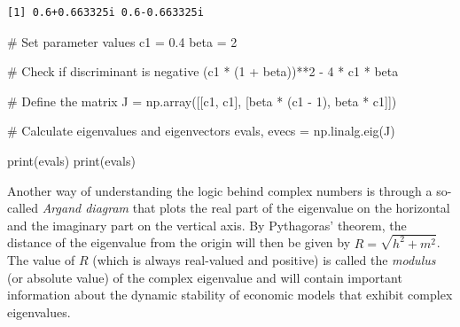 \documentclass[
  letterpaper,
  DIV=11,
  numbers=noendperiod]{scrreprt}
\newenvironment{Shaded}{\begin{snugshade}}{\end{snugshade}}
\newcommand{\BuiltInTok}[1]{\textcolor[rgb]{0.00,0.23,0.31}{#1}}
\newcommand{\CommentTok}[1]{\textcolor[rgb]{0.37,0.37,0.37}{#1}}
\newcommand{\DecValTok}[1]{\textcolor[rgb]{0.68,0.00,0.00}{#1}}
\newcommand{\FloatTok}[1]{\textcolor[rgb]{0.68,0.00,0.00}{#1}}
\newcommand{\NormalTok}[1]{\textcolor[rgb]{0.00,0.23,0.31}{#1}}
\newcommand{\OperatorTok}[1]{\textcolor[rgb]{0.37,0.37,0.37}{#1}}
\begin{document}
\begin{verbatim}
[1] 0.6+0.663325i 0.6-0.663325i
\end{verbatim}

\begin{tcolorbox}[enhanced jigsaw, titlerule=0mm, breakable, bottomrule=.15mm, toprule=.15mm, colbacktitle=quarto-callout-note-color!10!white, rightrule=.15mm, toptitle=1mm, opacityback=0, left=2mm, coltitle=black, title=\textcolor{quarto-callout-note-color}{\faInfo}\hspace{0.5em}{Python code}, colframe=quarto-callout-note-color-frame, opacitybacktitle=0.6, leftrule=.75mm, bottomtitle=1mm, arc=.35mm, colback=white]

\begin{Shaded}
\begin{Highlighting}[]
\CommentTok{\# Set parameter values}
\NormalTok{c1 }\OperatorTok{=} \FloatTok{0.4}
\NormalTok{beta }\OperatorTok{=} \DecValTok{2}

\CommentTok{\# Check if discriminant is negative}
\NormalTok{(c1 }\OperatorTok{*}\NormalTok{ (}\DecValTok{1} \OperatorTok{+}\NormalTok{ beta))}\OperatorTok{**}\DecValTok{2} \OperatorTok{{-}} \DecValTok{4} \OperatorTok{*}\NormalTok{ c1 }\OperatorTok{*}\NormalTok{ beta}

\CommentTok{\# Define the matrix}
\NormalTok{J }\OperatorTok{=}\NormalTok{ np.array([[c1, c1],}
\NormalTok{              [beta }\OperatorTok{*}\NormalTok{ (c1 }\OperatorTok{{-}} \DecValTok{1}\NormalTok{), beta }\OperatorTok{*}\NormalTok{ c1]])}

\CommentTok{\# Calculate eigenvalues and eigenvectors}
\NormalTok{evals, evecs }\OperatorTok{=}\NormalTok{ np.linalg.eig(J)}

\BuiltInTok{print}\NormalTok{(evals)}
\BuiltInTok{print}\NormalTok{(evals)}
\end{Highlighting}
\end{Shaded}

\end{tcolorbox}

Another way of understanding the logic behind complex numbers is through
a so-called \emph{Argand diagram} that plots the real part of the
eigenvalue on the horizontal and the imaginary part on the vertical
axis. By Pythagoras' theorem, the distance of the eigenvalue from the
origin will then be given by \(R=\sqrt{h^2+m^2}\). The value of \(R\)
(which is always real-valued and positive) is called the \emph{modulus}
(or absolute value) of the complex eigenvalue and will contain important
information about the dynamic stability of economic models that exhibit
complex eigenvalues.
\end{document}

